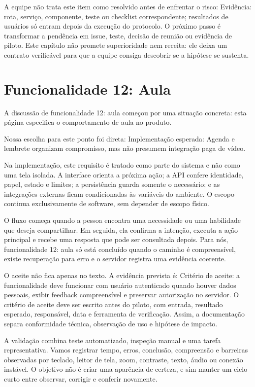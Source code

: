 \documentclass[12pt,oneside,a4paper,article]{abntex2}
\begin{document}
A equipe não trata este item como resolvido antes de enfrentar o risco: Evidência: rota, serviço, componente, teste ou checklist correspondente; resultados de usuários só entram depois da execução do protocolo. O próximo passo é transformar a pendência em issue, teste, decisão de reunião ou evidência de piloto. Este capítulo não promete superioridade nem receita: ele deixa um contrato verificável para que a equipe consiga descobrir se a hipótese se sustenta.

\section{Funcionalidade 12: Aula}
A discussão de funcionalidade 12: aula começou por uma situação concreta: esta página especifica o comportamento de aula no produto.

Nossa escolha para este ponto foi direta: Implementação esperada: Agenda e lembrete organizam compromisso, mas não presumem integração paga de vídeo.

Na implementação, este requisito é tratado como parte do sistema e não como uma tela isolada. A interface orienta a próxima ação; a API confere identidade, papel, estado e limites; a persistência guarda somente o necessário; e as integrações externas ficam condicionadas às variáveis do ambiente. O escopo continua exclusivamente de software, sem depender de escopo físico.

O fluxo começa quando a pessoa encontra uma necessidade ou uma habilidade que deseja compartilhar. Em seguida, ela confirma a intenção, executa a ação principal e recebe uma resposta que pode ser consultada depois. Para nós, funcionalidade 12: aula só está concluído quando o caminho é compreensível, existe recuperação para erro e o servidor registra uma evidência coerente.

O aceite não fica apenas no texto. A evidência prevista é: Critério de aceite: a funcionalidade deve funcionar com usuário autenticado quando houver dados pessoais, exibir feedback compreensível e preservar autorização no servidor. O critério de aceite deve ser escrito antes do piloto, com entrada, resultado esperado, responsável, data e ferramenta de verificação. Assim, a documentação separa conformidade técnica, observação de uso e hipótese de impacto.

A validação combina teste automatizado, inspeção manual e uma tarefa representativa. Vamos registrar tempo, erros, conclusão, compreensão e barreiras observadas por teclado, leitor de tela, zoom, contraste, texto, áudio ou conexão instável. O objetivo não é criar uma aparência de certeza, e sim manter um ciclo curto entre observar, corrigir e conferir novamente.
\end{document}
